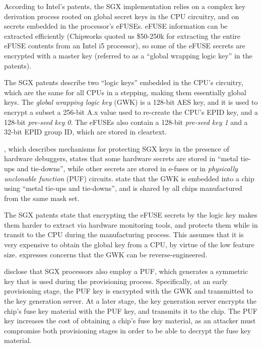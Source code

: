 


According to Intel's patents, the SGX implementation relies on a complex key
derivation process rooted on global secret keys in the CPU circuitry, and on
secrets embedded in the processor's eFUSEs. eFUSE information can be extracted
efficiently (Chipworks quoted us \$50-250k for extracting the entire eFUSE
contents from an Intel i5 processor), so some of the eFUSE secrets are
encrypted with a master key (referred to as a ``global wrapping logic key'' in
the patents).

The SGX patents describe two ``logic keys'' embedded in the CPU's circuitry,
which are the same for all CPUs in a stepping, making them essentially global
keys. The \textit{global wrapping logic key} (GWK) is a 128-bit AES key, and it is
used to encrypt a subset a 256-bit A.x value used to re-create the CPU's EPID
key, and a 128-bit \textit{pre-seed key 0}. The eFUSEs also contain a 128-bit
\textit{pre-seed key 1} and a 32-bit EPID group ID, which are stored in
cleartext.

\cite{shanbhogue2015gdxcsgx}, which describes mechanisms for protecting SGX
keys in the presence of hardware debuggers, states that some hardware secrets
are stored in ``metal tie-ups and tie-downs'', while other secrets are stored
in e-fuses or in \textit{physically unclonable function} (PUF) circuits.
\cite{brickell2014hardening, gotze2014provisioning} state that the GWK is
embedded into a chip using ``metal tie-ups and tie-downs'', and is shared by
all chips manufactured from the same mask set.

The SGX patents state that encrypting the eFUSE secrets by the logic key makes
them harder to extract via hardware monitoring tools, and protects them while
in transit to the CPU during the manufacturing process. This assumes that it is
very expensive to obtain the global key from a CPU, by virtue of the low
feature size. \cite{gotze2014provisioning} expresses concerns that the GWK can
be reverse-engineered.

\cite{gotze2014provisioning, gotze2014provisioning2} disclose that SGX
processors also employ a PUF, which generates a symmetric key that is used
during the provisioning process.  Specifically, at an early provisioning stage,
the PUF key is encrypted with the GWK and transmitted to the key generation
server. At a later stage, the key generation server encrypts the chip's fuse
key material with the PUF key, and transmits it to the chip. The PUF key
increases the cost of obtaining a chip's fuse key material, as an attacker must
compromise both provisioning stages in order to be able to decrypt the fuse key
material.

